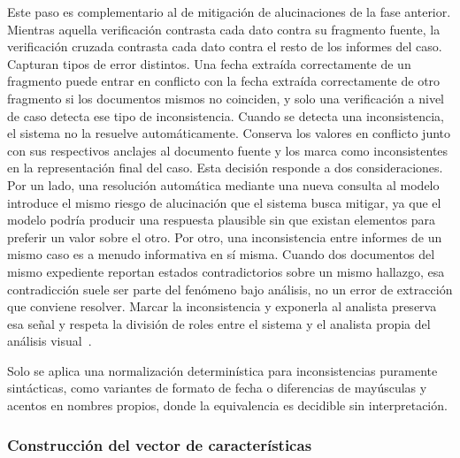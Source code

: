 Este paso es complementario al de mitigación de alucinaciones 
de la fase anterior. Mientras aquella verificación contrasta 
cada dato contra su fragmento fuente, la verificación cruzada 
contrasta cada dato contra el resto de los informes del caso. 
Capturan tipos de error distintos. Una fecha extraída 
correctamente de un fragmento puede entrar en conflicto con la 
fecha extraída correctamente de otro fragmento si los documentos 
mismos no coinciden, y solo una verificación a nivel de caso 
detecta ese tipo de inconsistencia.
Cuando se detecta una inconsistencia, el sistema no la resuelve 
automáticamente. Conserva los valores en conflicto junto con 
sus respectivos anclajes al documento fuente y los marca como 
inconsistentes en la representación final del caso. Esta 
decisión responde a dos consideraciones. Por un lado, una 
resolución automática mediante una nueva consulta al modelo 
introduce el mismo riesgo de alucinación que el sistema busca 
mitigar, ya que el modelo podría producir una respuesta 
plausible sin que existan elementos para preferir un valor 
sobre el otro. Por otro, una inconsistencia entre informes de 
un mismo caso es a menudo informativa en sí misma. Cuando dos 
documentos del mismo expediente reportan estados contradictorios 
sobre un mismo hallazgo, esa contradicción suele ser parte del 
fenómeno bajo análisis, no un error de extracción que conviene 
resolver. Marcar la inconsistencia y exponerla al analista 
preserva esa señal y respeta la división de roles entre el 
sistema y el analista propia del análisis 
visual~\cite{keim2008visual}.

Solo se aplica una normalización determinística para 
inconsistencias puramente sintácticas, como variantes de 
formato de fecha o diferencias de mayúsculas y acentos en 
nombres propios, donde la equivalencia es decidible sin 
interpretación.

\subsubsection{Construcción del vector de características}

